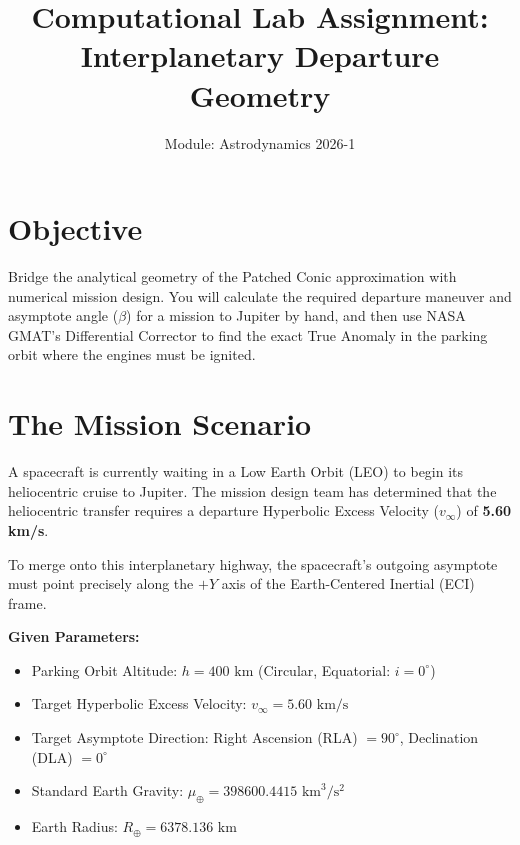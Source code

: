 \documentclass[12pt]{article}
\title{\textbf{Computational Lab Assignment: \\ Interplanetary Departure Geometry}}
\author{Module: Astrodynamics 2026-1}
\date{}
\begin{document}
\maketitle

\section*{Objective}
Bridge the analytical geometry of the Patched Conic approximation with numerical mission design. You will calculate the required departure maneuver and asymptote angle ($\beta$) for a mission to Jupiter by hand, and then use NASA GMAT's Differential Corrector to find the exact True Anomaly in the parking orbit where the engines must be ignited.

\section*{The Mission Scenario}
A spacecraft is currently waiting in a Low Earth Orbit (LEO) to begin its heliocentric cruise to Jupiter. The mission design team has determined that the heliocentric transfer requires a departure Hyperbolic Excess Velocity ($v_\infty$) of \textbf{5.60 km/s}. 

To merge onto this interplanetary highway, the spacecraft's outgoing asymptote must point precisely along the $+Y$ axis of the Earth-Centered Inertial (ECI) frame. 

\textbf{Given Parameters:}
\begin{itemize}
    \item Parking Orbit Altitude: $h = 400 \text{ km}$ (Circular, Equatorial: $i = 0^\circ$)
    \item Target Hyperbolic Excess Velocity: $v_\infty = 5.60 \text{ km/s}$
    \item Target Asymptote Direction: Right Ascension (RLA) $= 90^\circ$, Declination (DLA) $= 0^\circ$
    \item Standard Earth Gravity: $\mu_\oplus = 398600.4415 \text{ km}^3/\text{s}^2$
    \item Earth Radius: $R_\oplus = 6378.136 \text{ km}$
\end{itemize}

\vspace{0.5cm}
\end{document}
